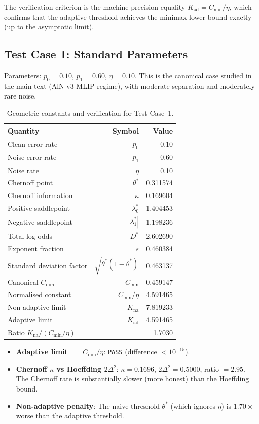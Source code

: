 The verification criterion is the machine-precision equality $K_{\mathrm{ad}} = C_{\min}/\eta$, which confirms that the adaptive threshold achieves the minimax lower bound exactly (up to the asymptotic limit).

\subsection{Test Case 1: Standard Parameters}

Parameters: $p_0 = 0.10$, $p_1 = 0.60$, $\eta = 0.10$. This is the canonical case studied in the main text (AlN v3 MLIP regime), with moderate separation and moderately rare noise.

\begin{table}[htbp]
\centering
\caption{Geometric constants and verification for Test Case~1.}
\label{tab:case1}
\begin{tabular}{lrr}
\toprule
Quantity & Symbol & Value \\
\midrule
Clean error rate & $p_0$ & 0.10 \\
Noise error rate & $p_1$ & 0.60 \\
Noise rate & $\eta$ & 0.10 \\
Chernoff point & $\theta^*$ & 0.311574 \\
Chernoff information & $\kappa$ & 0.169604 \\
Positive saddlepoint & $\lambda_0^*$ & 1.404453 \\
Negative saddlepoint & $|\lambda_1^*|$ & 1.198236 \\
Total log-odds & $D^*$ & 2.602690 \\
Exponent fraction & $s$ & 0.460384 \\
Standard deviation factor & $\sqrt{\theta^*(1-\theta^*)}$ & 0.463137 \\
\midrule
Canonical $C_{\min}$ & $C_{\min}$ & 0.459147 \\
Normalised constant & $C_{\min}/\eta$ & 4.591465 \\
Non-adaptive limit & $K_{\mathrm{na}}$ & 7.819233 \\
Adaptive limit & $K_{\mathrm{ad}}$ & 4.591465 \\
Ratio $K_{\mathrm{na}} / (C_{\min}/\eta)$ & & 1.7030 \\
\bottomrule
\end{tabular}
\end{table}

\begin{itemize}
    \item\textbf{Adaptive limit $=$ $C_{\min}/\eta$}: \texttt{PASS} (difference $< 10^{-15}$).
    \item\textbf{Chernoff $\kappa$ vs Hoeffding $2\Delta^2$}: $\kappa = 0.1696$, $2\Delta^2 = 0.5000$, ratio $= 2.95$. The Chernoff rate is substantially slower (more honest) than the Hoeffding bound.
    \item\textbf{Non-adaptive penalty}: The naive threshold $\theta^*$ (which ignores $\eta$) is $1.70\times$ worse than the adaptive threshold.
\end{itemize}

